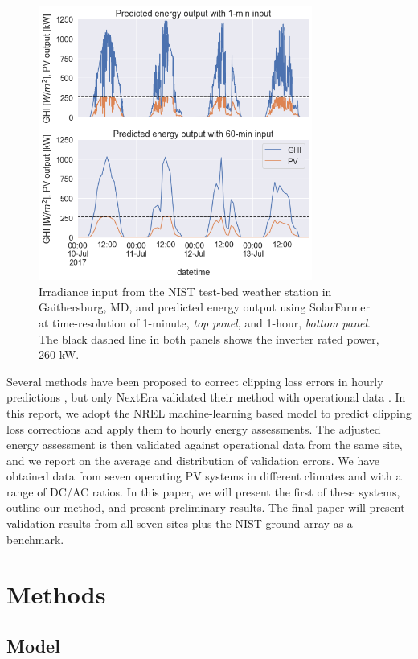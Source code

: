 \documentclass[conference]{IEEEtran}
\begin{document}
\begin{figure}[htbp]
\centerline{\includegraphics[width=9cm]{hourly_v_1-min_clipping.png}}
\caption{Irradiance input from the NIST test-bed weather station in Gaithersburg, MD, and predicted energy output using SolarFarmer at time-resolution of 1-minute, \textit{top panel}, and 1-hour, \textit{bottom panel}. The black dashed line in both panels shows the inverter rated power, 260-kW.}
\label{fig:irradiance-and-power}
\end{figure}

Several methods have been proposed to correct clipping loss errors in hourly predictions \cite{Cormode2019,Kharait,Anderson2020,Bradford}, but only NextEra validated their method with operational data \cite{Bradford}. In this report, we adopt the NREL machine-learning based model \cite{Anderson2020} to predict clipping loss corrections and apply them to hourly energy assessments. The adjusted energy assessment is then validated against operational data from the same site, and we report on the average and distribution of validation errors.  We have obtained data from seven operating PV systems in different climates and with a range of DC/AC ratios. In this paper, we will present the first of these systems, outline our method, and present preliminary results. The final paper will present validation results from all seven sites plus the NIST ground array \cite{Boyd2017b} as a benchmark.

\section{Methods}

\subsection{Model}
\end{document}
